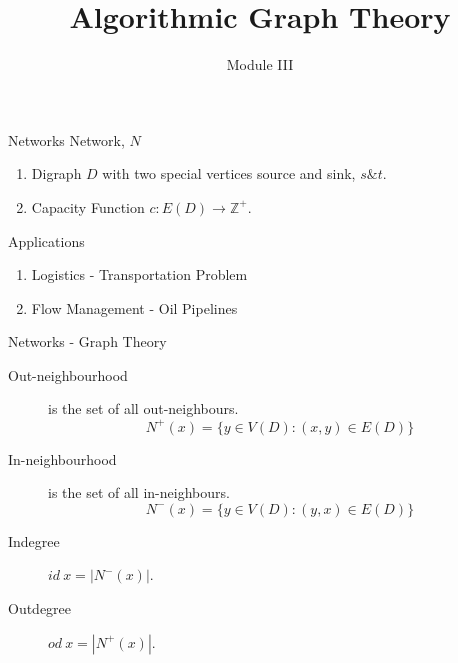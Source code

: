 \documentclass{beamer}
\title{Algorithmic Graph Theory}
\author{Module III}
\institute{Chapter 5 : Networks}
\begin{document}
\begin{frame}
\maketitle
\end{frame}

\begin{frame}{Networks}
Network, $N$
\begin{enumerate}
	\item Digraph $D$ with two special vertices source and sink, $s \& t$.
	\item Capacity Function $c : E(D) \to \mathbb{Z}^+$.
\end{enumerate}

\begin{figure}[hbt]
\centering
{}
\end{figure}

Applications
\begin{enumerate}
	\item Logistics - Transportation Problem
	\item Flow Management - Oil Pipelines
\end{enumerate}
\end{frame}

\begin{frame}{Networks - Graph Theory}
\begin{description}
	\item[Out-neighbourhood] is the set of all out-neighbours.
	$$N^+(x) = \{ y \in V(D) : (x,y) \in E(D) \}$$
	\item[In-neighbourhood] is the set of all in-neighbours.
	$$N^-(x) = \{ y \in V(D) : (y,x) \in E(D) \}$$
	\item[Indegree] $id\ x = |N^-(x)|$.
	\item[Outdegree] $od\ x = |N^+(x)|$.
\end{description}
\end{frame}
\end{document}
